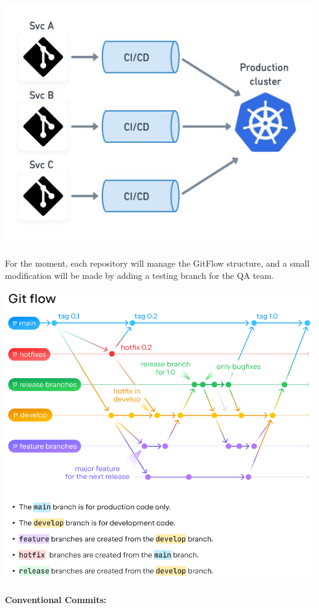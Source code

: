 \includegraphics[width=\textwidth]{./methodology/src/assets/microdeployment.jpg}

For the moment, each repository will manage the GitFlow structure, and a
small modification will be made by adding a testing branch for the QA
team.

\includegraphics[width=\textwidth]{./methodology/src/assets/gitflow.png}

\hypertarget{conventionalcommits}{
\paragraph{Conventional Commits:}\label{conventionalcommits}}

